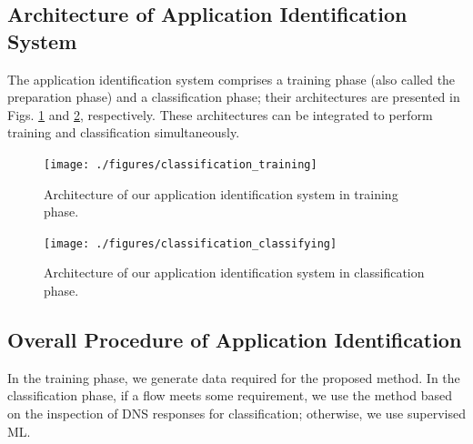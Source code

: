 \documentclass[10pt,journal]{IEEEtran}
\begin{document}
\subsection{Architecture of Application Identification System}
The application identification system comprises a training phase (also called the preparation phase) and a classification phase; their architectures are presented in Figs. \ref{fig:class_training} and \ref{fig:class_classifying}, respectively. These architectures can be integrated to perform training and classification simultaneously.

\begin{figure}[!t]
\centering
\texttt{[image: ./figures/classification\_training]}
\caption{Architecture of our application identification system in training phase.}
\label{fig:class_training}
\end{figure}

\begin{figure}[!t]
\centering
\texttt{[image: ./figures/classification\_classifying]}
\caption{Architecture of our application identification system in classification phase.}
\label{fig:class_classifying}
\end{figure}



\subsection{Overall Procedure of Application Identification}
In the training phase, we generate data required for the proposed method. In the classification phase, if a flow meets some requirement, we use the method based on the inspection of DNS responses for classification; otherwise, we use supervised ML.
\end{document}
